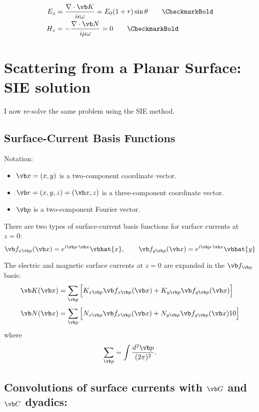 \documentclass{article}
\begin{document}
\begin{align*}
  E_z &= \frac{\nabla \cdot \vb K}{i\epsilon\omega} = E_0(1+r)\sin\theta
\qquad \text{\CheckmarkBold}
\\
  H_z & = -\frac{\nabla \cdot \vb N}{i\mu\omega} 
        = 0
\qquad \text{\CheckmarkBold}
\end{align*}

\newpage
\section{Scattering from a Planar Surface: SIE solution}

I now re-solve the same problem using the SIE method.

\subsection{Surface-Current Basis Functions}

Notation: 

\begin{itemize}
 \item $\vb x =(x,y)$ is a two-component coordinate vector.
 \item $\vb r =(x,y,z)=(\vb x, z)$ is a three-component coordinate vector.
 \item $\vb p  $ is a two-component Fourier vector.
\end{itemize}

There are two types of surface-current basis functions 
for surface currents at $z=0$:
$$ \vb f_{x\vb p}(\vb x) = e^{i\vb p \cdot \vb x} \vbhat{x}, \qquad
   \vb f_{y\vb p}(\vb x) = e^{i\vb p \cdot \vb x} \vbhat{y}
$$

The electric and magnetic surface currents at $z=0$ are 
expanded in the $\vb f_{\vb p}$ basis:
\begin{align*}
  \vb K(\vb x) 
&= \sum_{\vb p}
   \Big[   K_{x\vb p} \vb f_{x\vb p}(\vb x)  
         + K_{y\vb p} \vb f_{y\vb p}(\vb x)  
   \Big]
\\[3pt]
  \vb N(\vb x) 
&= \sum_{\vb p}
   \Big[   N_{x\vb p} \vb f_{x\vb p}(\vb x)  
         + N_{y\vb p} \vb f_{y\vb p}(\vb x)  10
   \Big]
\end{align*}
where  
$$ \sum_{\vb p} = \int\frac{d^2 \vb p}{(2\pi)^2}. $$

\subsection{Convolutions of surface currents with $\vb G$ and $\vb C$ dyadics:}
\end{document}
